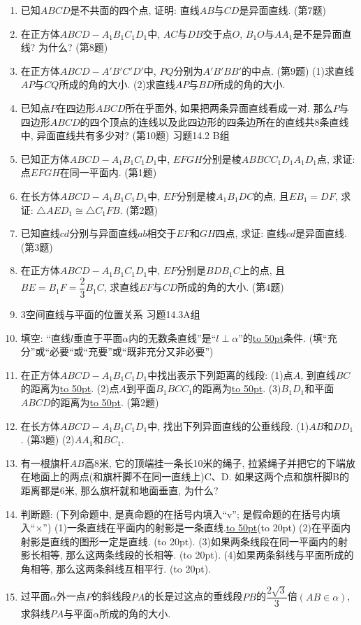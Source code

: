 \documentclass[10pt,a4paper]{article}
\newcommand{\blank}[1]{\underline{\hbox to #1pt{}}}
\newcommand{\bracket}[1]{(\hbox to #1pt{})}
\begin{document}
\begin{enumerate}[1.]
(第6题)
\item 已知$ABCD$是不共面的四个点, 证明: 直线$AB$与$CD$是异面直线.
(第7题)
\item 在正方体$ABCD-A_1B_1C_1D_1$中, $AC$与$DB$交于点$O$, $B_1O$与$AA_1$是不是异面直线? 为什么?
(第8题)
\item 在正方体$ABCD-A'B'C'D'$中, $PQ$分别为$A'B'BB'$的中点.
(第9题)
(1)求直线$AP$与$CQ$所成的角的大小.
(2)求直线$AP$与$BD$所成的角的大小.
\item 已知点$P$在四边形$ABCD$所在乎面外, 如果把两条异面直线看成一对. 那么$P$与四边形$ABCD$的四个顶点的连线以及此四边形的四条边所在的直线共8条直线中, 异面直线共有多少对?
(第10题)
习题14.2 B组
\item 已知正方体$ABCD-A_1B_1C_1D_1$中, $EFGH$分别是棱$ABBCC_1D_1A_1D_1$点, 求证: 点$EFGH$在同一平面内.
(第1题)
\item 在长方体$ABCD-A_1B_1C_1D_1$中, $EF$分别是棱$A_1B_1DC$的点, 且$EB_1=DF$, 求证: $\triangle AED_1\cong \triangle C_1FB$.
(第2题)
\item 已知直线$cd$分别与异面直线$ab$相交于$EF$和$GH$四点, 求证: 直线$cd$是异面直线.
(第3题)
\item 在正方体$ABCD-A_1B_1C_1D_1$中, $EF$分别是$BDB_1C$上的点, 且$BE=B_1F=\dfrac 23B_1C$, 求直线$EF$与$CD$所成的角的大小.
(第4题)
\item 3空间直线与平面的位置关系
习题14.3A组
\item 填空:
``直线$l$垂直于平面$\alpha$内的无数条直线''是``$l\perp \alpha$''的\blank{50}条件. (填``充分''或``必要``或``充要''或``既非充分又非必要'')
\item 在正方体$ABCD-A_1B_1C_1D_1$中找出表示下列距离的线段:
(1)点$A$, 到直线$BC$的距离为\blank{50}.
(2)点$A$到平面$B_1BCC_1$的距离为\blank{50}.
(3)$B_1D_1$和平面$ABCD$的距离为\blank{50}.
(第2题)
\item 在长方体$ABCD-A_1B_1C_1D_1$中, 找出下列异面直线的公垂线段.
(1)$AB$和$DD_1$.
(第3题)
(2)$AA_1$和$BC_1$.
\item 有一根旗杆$AB$高8米, 它的顶端挂一条长10米的绳子, 拉紧绳子并把它的下端放在地面上的两点(和旗杆脚不在同一直线上)C、D. 如果这两个点和旗杆脚B的距离都是6米, 那么旗杆就和地面垂直, 为什么?
\item 判断题: (下列命题中, 是真命题的在括号内填入``v''; 是假命题的在括号内填入``×'')
(1)一条直线在平面内的射影是一条直线.\blank{50}\bracket{20}
(2)在平面内射影是直线的图形一定是直线.   \bracket{20}.
(3)如果两条线段在同一平面内的射影长相等, 那么这两条线段的长相等. \bracket{20}.
(4)如果两条斜线与平面所成的角相等, 那么这两条斜线互相平行. \bracket{20}.
\item 过平面$\alpha$外一点$P$的斜线段$PA$的长是过这点的垂线段$PB$的$\dfrac{2\sqrt 3}3$倍$(AB\in \alpha)$, 求斜线$PA$与平面$\alpha$所成的角的大小.

\end{enumerate}
\end{document}
